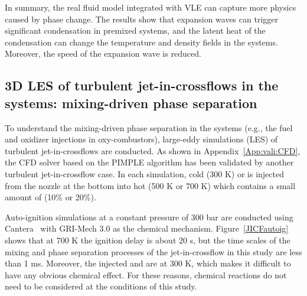 In summary, the real fluid model integrated with VLE can capture more physics caused by phase change. %
The results show that expansion waves can trigger significant condensation in premixed  systems, and the latent heat of the condensation can change the temperature and density fields in the systems. Moreover, the speed of the expansion wave is reduced.

\subsection{3D LES of turbulent jet-in-crossflows in the  systems: mixing-driven phase separation}
\label{sec:results:JICF}
To understand the mixing-driven phase separation in the  systems (e.g., the fuel and oxidizer injections in  oxy-combustors), large-eddy simulations (LES) of turbulent jet-in-crossflows are conducted. As shown in Appendix~\ref{App:vali:CFD}, the CFD solver based on the PIMPLE algorithm has been validated by another turbulent jet-in-crossflow case. %
In each simulation, cold (300 K)  or  is injected from the nozzle at the bottom into hot (500 K or 700 K)  which contains a small amount of  (10\% or 20\%). %

Auto-ignition simulations at a constant pressure of 300 bar are conducted using Cantera~\cite{goodwin2009cantera} with GRI-Mech 3.0 \cite{smith1999gri} as the chemical mechanism. Figure~\ref{JICFautoig} shows that at 700 K the ignition delay is about 20 s, but the time scales of the mixing and phase separation processes of the jet-in-crossflow in this study are less than 1 ms. Moreover, the injected  and  are at 300 K, which makes it difficult to have any obvious chemical effect. For these reasons, chemical reactions do not need to be considered at the conditions of this study.

